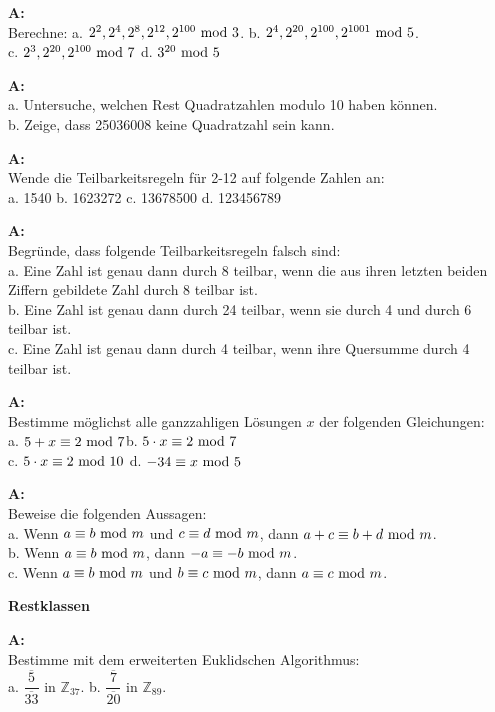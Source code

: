 \documentclass[landscape,twocolumn,a4paper]{article}
\begin{document}
\textbf{A:}   \\
Berechne: a. $2^2, 2^4, 2^8, 2^{12}, 2^{100} \text{ mod } 3$. \quad b. $2^4,2^{20},2^{100},2^{1001} \text{ mod } 5$. \\
c. $2^3, 2^{20}, 2^{100} \text{ mod } 7$ \quad d. $3^{20} \text{ mod } 5$
\bigskip {}

\textbf{A:}   \\
a. Untersuche, welchen Rest Quadratzahlen modulo 10 haben können. \\
b. Zeige, dass 25036008 keine Quadratzahl sein kann.
\bigskip {}

\textbf{A:}   \\
Wende die Teilbarkeitsregeln für 2-12 auf folgende Zahlen an:\\
a. 1540 \quad b. 1623272 \quad c. 13678500 \quad d. 123456789
\bigskip {}

\textbf{A:}   \\
Begründe, dass folgende Teilbarkeitsregeln falsch sind: \\
a. Eine Zahl ist genau dann durch 8 teilbar, wenn die aus ihren letzten beiden Ziffern gebildete Zahl durch 8 teilbar ist. \\
b. Eine Zahl ist genau dann durch 24 teilbar, wenn sie durch 4 und durch 6 teilbar ist. \\
c. Eine Zahl ist genau dann durch 4 teilbar, wenn ihre Quersumme durch 4 teilbar ist.
\bigskip {}

\textbf{A:}   \\
Bestimme möglichst alle ganzzahligen Lösungen $x$ der folgenden
  Gleichungen: \\
a. $5+x\equiv2\text{ mod }7$\quad b.   $5\cdot x\equiv2\text{ mod }7$ \\ 
c. $5\cdot x\equiv2\text{ mod }10$  \quad d.  $-34\equiv x\text{ mod }5$
\bigskip {}

\textbf{A:}   \\
Beweise die folgenden Aussagen:\\
a. Wenn $a\equiv b\text{ mod }m$ und $c\equiv d\text{ mod }m$, dann
    $a+c\equiv b+d\text{ mod }m$. \\
b. Wenn $a\equiv b\text{ mod }m$, dann $-a\equiv-b\text{ mod }m$. \\
c. Wenn $a\equiv b\text{ mod }m$ und $b\equiv c\text{ mod }m$, dann
    $a\equiv c\text{ mod }m$.
\bigskip {}

 \textbf{Restklassen} \bigskip

\textbf{A:}   \\
Bestimme mit dem erweiterten Euklidschen Algorithmus: \\
 a.  $\dfrac{\overline{5}}{\overline{33}}$ in  $\mathbb{Z}_{37}$. \quad
 b.  $\dfrac{\overline{7}}{\overline{20}}$ in  $\mathbb{Z}_{89}$.
\bigskip {}
\end{document}

